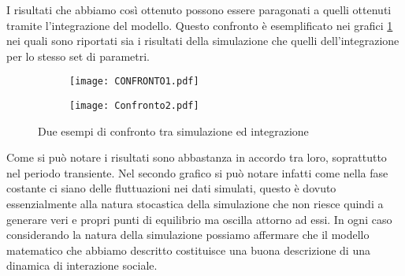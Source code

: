 I risultati che abbiamo così ottenuto possono essere paragonati a quelli ottenuti tramite l'integrazione del modello. Questo confronto è esemplificato nei grafici \ref{confromto} nei quali sono riportati sia i risultati della simulazione che quelli dell'integrazione per lo stesso set di parametri.\\ 
\begin{figure}[H]
	\centering
	\begin{subfigure}[H]{0.49\textwidth}
		\centering
		\texttt{[image: CONFRONTO1.pdf]}
	\end{subfigure}
	\hfill
	\begin{subfigure}[H]{0.49\textwidth}
		\centering
		\texttt{[image: Confronto2.pdf]}
	\end{subfigure}
	\caption{Due esempi di confronto tra simulazione ed integrazione}
	\label{confromto}
\end{figure}
Come si può notare i risultati sono abbastanza in accordo tra loro, soprattutto nel periodo transiente. Nel secondo grafico si può notare infatti come nella fase costante ci siano delle fluttuazioni nei dati simulati, questo è dovuto essenzialmente alla natura stocastica della simulazione che non riesce quindi a generare veri e propri punti di equilibrio ma oscilla attorno ad essi. In ogni caso considerando la natura della simulazione possiamo affermare che il modello matematico che abbiamo descritto costituisce una buona descrizione di una dinamica di interazione sociale.
